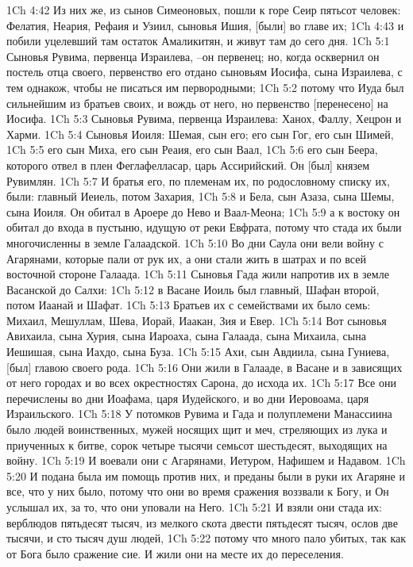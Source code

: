 1Ch 4:42  Из них же, из сынов Симеоновых, пошли к горе Сеир пятьсот человек: Фелатия, Неария, Рефаия и Узиил, сыновья Ишия, [были] во главе их;
1Ch 4:43  и побили уцелевший там остаток Амаликитян, и живут там до сего дня.
1Ch 5:1  Сыновья Рувима, первенца Израилева, --он первенец; но, когда осквернил он постель отца своего, первенство его отдано сыновьям Иосифа, сына Израилева, с тем однакож, чтобы не писаться им первородными;
1Ch 5:2  потому что Иуда был сильнейшим из братьев своих, и вождь от него, но первенство [перенесено] на Иосифа.
1Ch 5:3  Сыновья Рувима, первенца Израилева: Ханох, Фаллу, Хецрон и Харми.
1Ch 5:4  Сыновья Иоиля: Шемая, сын его; его сын Гог, его сын Шимей,
1Ch 5:5  его сын Миха, его сын Реаия, его сын Ваал,
1Ch 5:6  его сын Беера, которого отвел в плен Феглафелласар, царь Ассирийский. Он [был] князем Рувимлян.
1Ch 5:7  И братья его, по племенам их, по родословному списку их, были: главный Иеиель, потом Захария,
1Ch 5:8  и Бела, сын Азаза, сына Шемы, сына Иоиля. Он обитал в Ароере до Нево и Ваал-Меона;
1Ch 5:9  а к востоку он обитал до входа в пустыню, идущую от реки Евфрата, потому что стада их были многочисленны в земле Галаадской.
1Ch 5:10  Во дни Саула они вели войну с Агарянами, которые пали от рук их, а они стали жить в шатрах и по всей восточной стороне Галаада.
1Ch 5:11  Сыновья Гада жили напротив их в земле Васанской до Салхи:
1Ch 5:12  в Васане Иоиль был главный, Шафан второй, потом Иаанай и Шафат.
1Ch 5:13  Братьев их с семействами их было семь: Михаил, Мешуллам, Шева, Иорай, Иаакан, Зия и Евер.
1Ch 5:14  Вот сыновья Авихаила, сына Хурия, сына Иароаха, сына Галаада, сына Михаила, сына Иешишая, сына Иахдо, сына Буза.
1Ch 5:15  Ахи, сын Авдиила, сына Гуниева, [был] главою своего рода.
1Ch 5:16  Они жили в Галааде, в Васане и в зависящих от него городах и во всех окрестностях Сарона, до исхода их.
1Ch 5:17  Все они перечислены во дни Иоафама, царя Иудейского, и во дни Иеровоама, царя Израильского.
1Ch 5:18  У потомков Рувима и Гада и полуплемени Манассиина было людей воинственных, мужей носящих щит и меч, стреляющих из лука и приученных к битве, сорок четыре тысячи семьсот шестьдесят, выходящих на войну.
1Ch 5:19  И воевали они с Агарянами, Иетуром, Нафишем и Надавом.
1Ch 5:20  И подана была им помощь против них, и преданы были в руки их Агаряне и все, что у них было, потому что они во время сражения воззвали к Богу, и Он услышал их, за то, что они уповали на Него.
1Ch 5:21  И взяли они стада их: верблюдов пятьдесят тысяч, из мелкого скота двести пятьдесят тысяч, ослов две тысячи, и сто тысяч душ людей,
1Ch 5:22  потому что много пало убитых, так как от Бога было сражение сие. И жили они на месте их до переселения.
